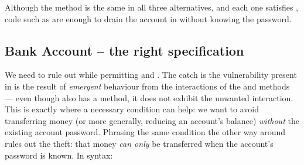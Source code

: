 Although the  method is the same in
all three alternatives, and each one satisfies ,
code such as
%
%
are enough to drain the account in  without knowing the password.


 \subsection{Bank Account -- the right specification}

We need to rule out  while permitting  and
. The catch is the vulnerability present in  is the result
of  \emph{emergent} behaviour from the interactions of the 
and  methods --- even though  also has a
 method, it does not exhibit the unwanted interaction.
This is exactly where a necessary condition can help:
we want to avoid transferring money
(or more generally, reducing an account's balance)
\textit{without} the existing account password.  Phrasing the same condition
the other way around %
rules out the theft: that money \textit{can only} be
transferred when the account's password is known.
In \Nec  syntax:

